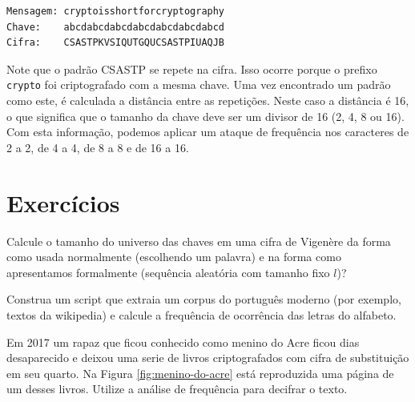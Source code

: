 \begin{example}
\begin{verbatim}
Mensagem: cryptoisshortforcryptography
Chave:    abcdabcdabcdabcdabcdabcdabcd
Cifra:    CSASTPKVSIQUTGQUCSASTPIUAQJB
\end{verbatim}  
\end{example}

Note que o padrão CSASTP se repete na cifra.
Isso ocorre porque o prefixo {\tt crypto} foi criptografado com a mesma chave.
Uma vez encontrado um padrão como este, é calculada a distância entre as repetições.
Neste caso a distância é 16, o que significa que o tamanho da chave deve ser um divisor de 16 (2, 4, 8 ou 16).
Com esta informação, podemos aplicar um ataque de frequência nos caracteres de 2 a 2, de 4 a 4, de 8 a 8 e de 16 a 16.

\section{Exercícios}
\label{sec:exercicios}


\begin{exercicio}
Calcule o tamanho do universo das chaves em uma cifra de Vigenère da forma como usada normalmente (escolhendo um palavra) e na forma como apresentamos formalmente (sequência aleatória com tamanho fixo $l$)?  
\end{exercicio}


\begin{exercicio}
Construa um script que extraia um corpus do português moderno (por exemplo, textos da wikipedia) e calcule a frequência de ocorrência das letras do alfabeto. 
\end{exercicio}

\begin{exercicio}
Em 2017 um rapaz que ficou conhecido como menino do Acre ficou dias desaparecido e deixou uma serie de livros criptografados com cifra de substituição em seu quarto.
Na Figura \ref{fig:menino-do-acre} está reproduzida uma página de um desses livros. 
Utilize a análise de frequência para decifrar o texto.
\end{exercicio}

